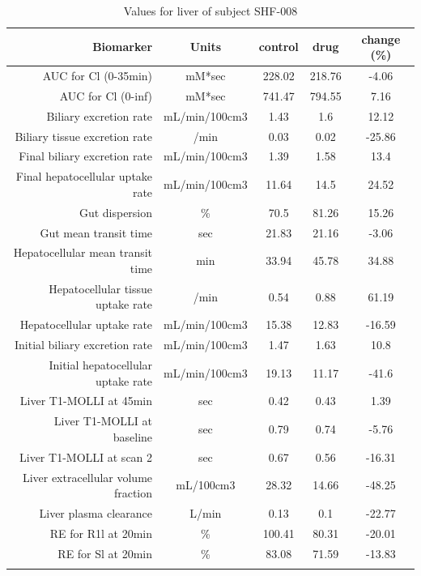 \documentclass{epflreport}%
\begin{document}
%
\clearpage%
\begin{longtable}{rcccc}%
\hline%
Biomarker&Units&control&drug&change (\%)\\%
\hline%
AUC for Cl (0{-}35min)&mM*sec&228.02&218.76&{-}4.06\\%
AUC for Cl (0{-}inf)&mM*sec&741.47&794.55&7.16\\%
Biliary excretion rate&mL/min/100cm3&1.43&1.6&12.12\\%
Biliary tissue excretion rate&/min&0.03&0.02&{-}25.86\\%
Final biliary excretion rate&mL/min/100cm3&1.39&1.58&13.4\\%
Final hepatocellular uptake rate&mL/min/100cm3&11.64&14.5&24.52\\%
Gut dispersion&\%&70.5&81.26&15.26\\%
Gut mean transit time&sec&21.83&21.16&{-}3.06\\%
Hepatocellular mean transit time&min&33.94&45.78&34.88\\%
Hepatocellular tissue uptake rate&/min&0.54&0.88&61.19\\%
Hepatocellular uptake rate&mL/min/100cm3&15.38&12.83&{-}16.59\\%
Initial biliary excretion rate&mL/min/100cm3&1.47&1.63&10.8\\%
Initial hepatocellular uptake rate&mL/min/100cm3&19.13&11.17&{-}41.6\\%
Liver T1{-}MOLLI at 45min&sec&0.42&0.43&1.39\\%
Liver T1{-}MOLLI at baseline&sec&0.79&0.74&{-}5.76\\%
Liver T1{-}MOLLI at scan 2&sec&0.67&0.56&{-}16.31\\%
Liver extracellular volume fraction&mL/100cm3&28.32&14.66&{-}48.25\\%
Liver plasma clearance&L/min&0.13&0.1&{-}22.77\\%
RE for R1l at 20min&\%&100.41&80.31&{-}20.01\\%
RE for Sl at 20min&\%&83.08&71.59&{-}13.83\\%
\hline%
\caption{Values for liver of subject SHF-008} \\%
\end{longtable}%
\end{document}
